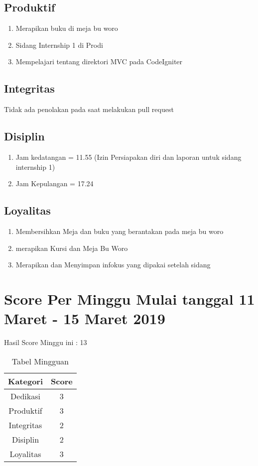 \subsection{Produktif}
\begin{enumerate}
\item Merapikan buku di meja bu woro
\item Sidang Internship 1 di Prodi
\item Mempelajari tentang direktori MVC pada CodeIgniter
\end{enumerate}
\subsection{Integritas}
Tidak ada penolakan pada saat melakukan pull request
\subsection{Disiplin}
\begin{enumerate}
\item Jam kedatangan =  11.55 (Izin Persiapakan diri dan laporan untuk sidang internship 1)
\item Jam Kepulangan = 17.24
\end{enumerate}
\subsection{Loyalitas}
\begin{enumerate}
\item Membersihkan Meja dan buku yang berantakan pada meja bu woro
\item merapikan Kursi dan Meja Bu Woro
\item Merapikan dan Menyimpan infokus yang dipakai setelah sidang
\end{enumerate}

\section {Score Per Minggu Mulai tanggal 11 Maret - 15 Maret 2019}
Hasil Score Minggu ini : 13
\begin{table}[h]
\caption{Tabel Mingguan}
\centering
\begin{tabular}{|c|c|}
\hline
\textbf{Kategori}&\textbf{Score}\\
\hline
Dedikasi&3\\
\hline
Produktif&3\\
\hline
Integritas&2\\
\hline
Disiplin&2\\
\hline
Loyalitas&3\\
\hline
\end{tabular}
\label{tsble:Laporan mingguan}
\end{table}


